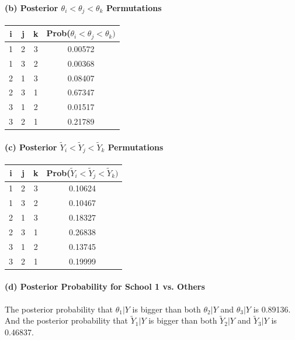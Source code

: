 \documentclass[11pt, letterpaper]{article}
\begin{document}
\paragraph{(b) Posterior $\theta_i < \theta_j < \theta_k$ Permutations}
\begin{center}
\begin{tabular}{||c c c c||} 
 \hline
 i & j & k & Prob($\theta_i<\theta_j<\theta_k)$ \\ [0.5ex] 
 \hline\hline
 1 & 2 & 3 & 0.00572 \\ 
 \hline
 1 & 3 & 2 & 0.00368 \\
 \hline
 2 & 1 & 3 & 0.08407 \\
 \hline
 2 & 3 & 1 & 0.67347 \\
 \hline
 3 & 1 & 2 & 0.01517 \\
 \hline
 3 & 2 & 1 & 0.21789 \\
 \hline
\end{tabular}
\end{center}

\paragraph{(c) Posterior $\tilde{Y}_i < \tilde{Y}_j < \tilde{Y}_k$ Permutations}
\begin{center}
\begin{tabular}{||c c c c||} 
 \hline
 i & j & k & Prob($\tilde{Y}_i < \tilde{Y}_j < \tilde{Y}_k)$ \\ [0.5ex] 
 \hline\hline
 1 & 2 & 3 & 0.10624 \\ 
 \hline
 1 & 3 & 2 & 0.10467 \\
 \hline
 2 & 1 & 3 & 0.18327 \\
 \hline
 2 & 3 & 1 & 0.26838 \\
 \hline
 3 & 1 & 2 & 0.13745 \\
 \hline
 3 & 2 & 1 & 0.19999 \\
 \hline
\end{tabular}
\end{center}

\paragraph{(d) Posterior Probability for School 1 vs. Others}
The posterior probability that $\theta_1|Y$ is bigger than both $\theta_2|Y$ and $\theta_3|Y$ is 0.89136.
And the posterior probability that $\tilde{Y}_1|Y$ is bigger than both $\tilde{Y}_2|Y$ and $\tilde{Y}_3|Y$ is 0.46837.
\end{document}
